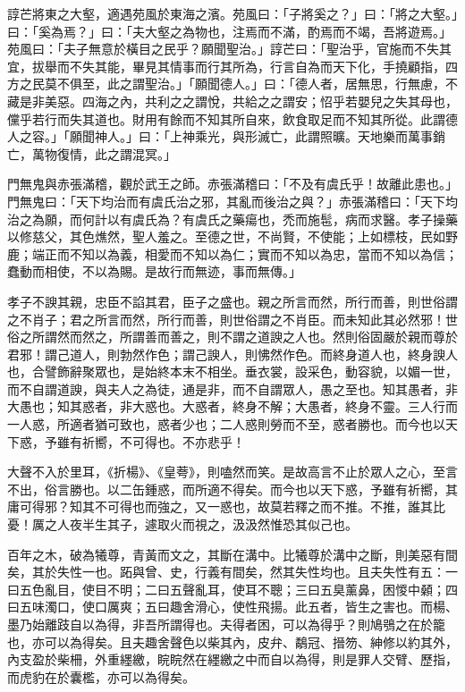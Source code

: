 \begin{pinyinscope}
諄芒將東之大壑，適遇苑風於東海之濱。苑風曰：「子將奚之？」曰：「將之大壑。」曰：「奚為焉？」曰：「夫大壑之為物也，注焉而不滿，酌焉而不竭，吾將遊焉。」苑風曰：「夫子無意於橫目之民乎？願聞聖治。」諄芒曰：「聖治乎，官施而不失其宜，拔舉而不失其能，畢見其情事而行其所為，行言自為而天下化，手撓顧指，四方之民莫不俱至，此之謂聖治。」「願聞德人。」曰：「德人者，居無思，行無慮，不藏是非美惡。四海之內，共利之之謂悅，共給之之謂安；怊乎若嬰兒之失其母也，儻乎若行而失其道也。財用有餘而不知其所自來，飲食取足而不知其所從。此謂德人之容。」「願聞神人。」曰：「上神乘光，與形滅亡，此謂照曠。天地樂而萬事銷亡，萬物復情，此之謂混冥。」

門無鬼與赤張滿稽，觀於武王之師。赤張滿稽曰：「不及有虞氏乎！故離此患也。」門無鬼曰：「天下均治而有虞氏治之邪，其亂而後治之與？」赤張滿稽曰：「天下均治之為願，而何計以有虞氏為？有虞氏之藥瘍也，禿而施髢，病而求醫。孝子操藥以修慈父，其色燋然，聖人羞之。至德之世，不尚賢，不使能；上如標枝，民如野鹿；端正而不知以為義，相愛而不知以為仁；實而不知以為忠，當而不知以為信；蠢動而相使，不以為賜。是故行而無迹，事而無傳。」

孝子不諛其親，忠臣不諂其君，臣子之盛也。親之所言而然，所行而善，則世俗謂之不肖子；君之所言而然，所行而善，則世俗謂之不肖臣。而未知此其必然邪！世俗之所謂然而然之，所謂善而善之，則不謂之道諛之人也。然則俗固嚴於親而尊於君邪！謂己道人，則勃然作色；謂己諛人，則怫然作色。而終身道人也，終身諛人也，合譬飾辭聚眾也，是始終本末不相坐。垂衣裳，設采色，動容貌，以媚一世，而不自謂道諛，與夫人之為徒，通是非，而不自謂眾人，愚之至也。知其愚者，非大愚也；知其惑者，非大惑也。大惑者，終身不解；大愚者，終身不靈。三人行而一人惑，所適者猶可致也，惑者少也；二人惑則勞而不至，惑者勝也。而今也以天下惑，予雖有祈嚮，不可得也。不亦悲乎！

大聲不入於里耳，《折楊》、《皇荂》，則嗑然而笑。是故高言不止於眾人之心，至言不出，俗言勝也。以二缶鍾惑，而所適不得矣。而今也以天下惑，予雖有祈嚮，其庸可得邪？知其不可得也而強之，又一惑也，故莫若釋之而不推。不推，誰其比憂！厲之人夜半生其子，遽取火而視之，汲汲然惟恐其似己也。

百年之木，破為犧尊，青黃而文之，其斷在溝中。比犧尊於溝中之斷，則美惡有間矣，其於失性一也。跖與曾、史，行義有間矣，然其失性均也。且夫失性有五：一曰五色亂目，使目不明；二曰五聲亂耳，使耳不聰；三曰五臭薰鼻，困惾中顙；四曰五味濁口，使口厲爽；五曰趣舍滑心，使性飛揚。此五者，皆生之害也。而楊、墨乃始離跂自以為得，非吾所謂得也。夫得者困，可以為得乎？則鳩鴞之在於籠也，亦可以為得矣。且夫趣舍聲色以柴其內，皮弁、鷸冠、搢笏、紳修以約其外，內支盈於柴柵，外重纆繳，睆睆然在纆繳之中而自以為得，則是罪人交臂、歷指，而虎豹在於囊檻，亦可以為得矣。


\end{pinyinscope}